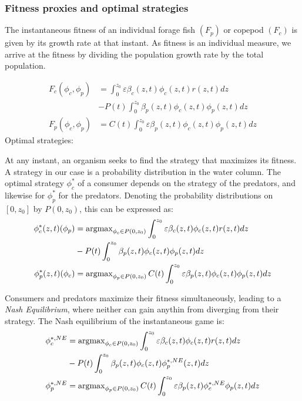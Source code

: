 \subsubsection*{Fitness proxies and optimal strategies}


The instantaneous fitness of an individual forage fish $(F_p)$ or copepod $(F_c)$ is given by its growth rate at that instant. As fitness is an individual measure, we arrive at the fitness by dividing the population growth rate  by the total population.

\begin{align}
	F_c(\phi_c, \phi_p) &= \int_0^{z_0} \varepsilon \beta_c(z,t)\phi_c(z,t)r(z,t) dz\\ &- P(t)\int_0^{z_0} \beta_p(z,t) \phi_c(z,t) \phi_p(z,t)dz \\
	F_p(\phi_c, \phi_p) &=  C(t) \int_0^{z_0} \varepsilon \beta_p(z,t)\phi_c(z,t)\phi_p(z,t) dz
\end{align}
Optimal strategies:

At any instant, an organism seeks to find the strategy that maximizes its fitness. A strategy in our case is a probability distribution in the water column. The optimal strategy $\phi_c^*$ of a consumer depends on the strategy of the predators, and likewise for $\phi_p^*$ for the predators. Denoting  the probability distributions on $[0,z_0]$ by $P(0,z_0)$, this can be expressed as:
\begin{align}
	\phi_c^*(z,t)(\phi_p) &= \argmax_{\phi_c \in P(0,z_0)}  \int_0^{z_0} \varepsilon \beta_c(z,t)\phi_c(z,t)r(z,t) dz \\ &- P(t)\int_0^{z_0} \beta_p(z,t) \phi_c(z,t) \phi_p(z,t)dz  \\
	\phi_p^*(z,t)(\phi_c) &= \argmax_{\phi_p \in P(0,z_0)}C(t) \int_0^{z_0} \varepsilon \beta_p(z,t)\phi_c(z,t)\phi_p(z,t) dz
\end{align}

Consumers and predators maximize their fitness simultaneously, leading to a \emph{Nash Equilibrium}, where neither can gain anythin from diverging from their strategy. The Nash equilibrium of the instantaneous game is:
\begin{align}
  \label{eq:nash_equilibria}
	\phi_c^{*,NE} &=  \argmax_{\phi_c \in P(0,z_0)}  \int_0^{z_0} \varepsilon \beta_c(z,t)\phi_c(z,t)r(z,t) dz \\ &- P(t)\int_0^{z_0} \beta_p(z,t) \phi_c(z,t) \phi_p^{*,NE}(z,t) dz \\
	\phi_p^{*,NE} &=  \argmax_{\phi_p \in P(0,z_0)}C(t) \int_0^{z_0} \varepsilon \beta_p(z,t)\phi_c^{*,NE} \phi_p(z,t) dz
\end{align}

